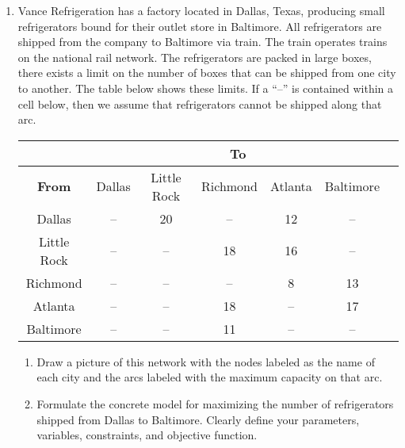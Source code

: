 \begin{enumerate}
\begin{enumerate}
\end{enumerate}


\newpage

\item Vance Refrigeration has a factory located in Dallas, Texas, producing small refrigerators bound for their outlet store in Baltimore. All refrigerators are shipped from the company to Baltimore via train. The train operates trains on the national rail network. The refrigerators are packed in large boxes, there exists a limit on the number of boxes that can be shipped from one city to another. The table below shows these limits. If a ``--'' is contained within a cell below, then we assume that refrigerators cannot be shipped along that arc.


\begin{center}
\begin{tabular}{ |c|c|c|c|c|c|c| } 
    \hline
    & \multicolumn{5}{c|}{ \textbf{To} }\\
    \hline
    \textbf{From} & Dallas & Little Rock & Richmond & Atlanta & Baltimore \\ 
    \hline
    Dallas  & --  & 20 & -- & 12 & --  \\ 
    \hline
    Little Rock & -- & --  & 18 & 16 &-- \\ 
    \hline
    Richmond & -- &  -- & -- & 8 & 13    \\ 
    \hline
    Atlanta &  -- & -- & 18 & --  & 17 \\ 
    \hline
    Baltimore & --  &  -- &  11 &--  &--   \\ 
    \hline
\end{tabular}
\end{center}


\begin{enumerate}

\item Draw a picture of this network with the nodes labeled as the name of each city and the arcs labeled with the maximum capacity on that arc.

\newpage

\item Formulate the concrete model for maximizing the number of refrigerators shipped from Dallas to Baltimore. Clearly define your parameters, variables, constraints, and objective function.
\newpage


\end{enumerate}
\end{enumerate}
